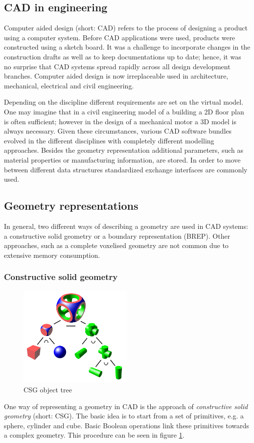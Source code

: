 \subsection{CAD in engineering}
Computer aided design (short: CAD) refers to the process of designing a product using a computer system. Before CAD applications were used, products were constructed using a sketch board. It was a challenge to incorporate changes in the construction drafts as well as to keep documentations up to date; hence, it was no surprise that CAD systems spread rapidly across all design development branches. Computer aided design is now irreplaceable used in architecture, mechanical, electrical and civil engineering.

Depending on the discipline different requirements are set on the virtual model. One may imagine that in a civil engineering model of a building a 2D floor plan is often sufficient; however in the design of a mechanical motor a 3D model is always necessary. Given these circumstances, various CAD software bundles evolved in the different disciplines with completely different modelling approaches. Besides the geometry representation additional parameters, such as material properties or manufacturing information, are stored. In order to move between different data structures standardized exchange interfaces are commonly used.
\subsection{Geometry representations}
In general, two different ways of describing a geometry are used in CAD systems: a constructive solid geometry or a boundary representation (BREP). Other approaches, such as a complete voxelised geometry are not common due to extensive memory consumption.
\subsubsection{Constructive solid geometry}
\begin{figure}
\centering
\includegraphics[width=0.5\textwidth]{Pictures/Csg_tree.png}
\caption{CSG object tree}
\label{fig:csg_tree}
\end{figure}
One way of representing a geometry in CAD is the approach of \emph{constructive solid geometry} (short: CSG). The basic idea is to start from a set of primitives, e.g. a sphere, cylinder and cube. Basic Boolean operations link these primitives towards a complex geometry. This procedure can be seen in figure \ref{fig:csg_tree}.

